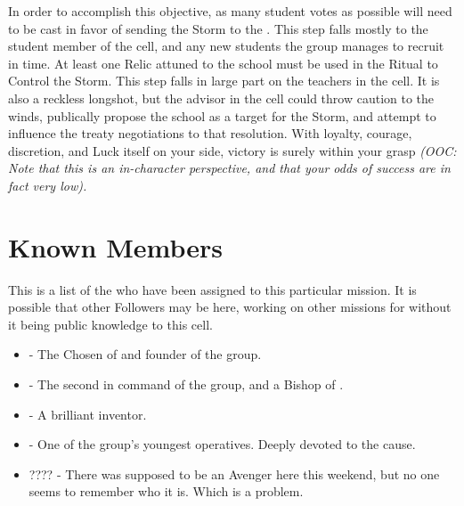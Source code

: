 \documentclass[blue]{GL2020}
\begin{document}
In order to accomplish this objective, as many student votes as possible will need to be cast in favor of sending the Storm to the \pSc{}. This step falls mostly to the student member of the cell, and any new students the group manages to recruit in time. At least one Relic attuned to the school must be used in the Ritual to Control the Storm. This step falls in large part on the teachers in the cell. It is also a reckless longshot, but the advisor in the cell could throw caution to the winds, publically propose the school as a target for the Storm, and attempt to influence the treaty negotiations to that resolution. With loyalty, courage, discretion, and Luck itself on your side, victory is surely within your grasp \emph{(OOC: Note that this is an in-character perspective, and that your odds of success are in fact very low).}

\section*{Known Members}
This is a list of the \pGoaties{} who have been assigned to this particular mission. It is possible that other Followers may be here, working on other missions for \cGenesis{} without it being public knowledge to this cell.
\begin{itemize}
    \item \cChupLeader{\full} - The Chosen of \cGenesis{} and founder of the group.
    \item \cChupSecond{\full} - The second in command of the group, and a Bishop of \cGenesis{}.
    \item \cChupInventor{\full} - A brilliant inventor.
    \item \cChupStudent{\full} - One of the group's youngest operatives. Deeply devoted to the cause.
    \item ???? - There was supposed to be an Avenger here this weekend, but no one seems to remember who it is. Which is a problem.
\end{itemize}
\end{document}
